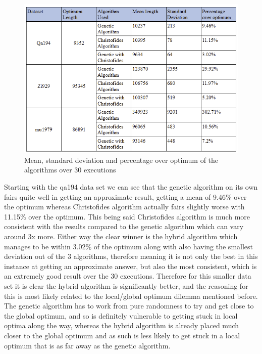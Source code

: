 \documentclass[11pt,a4paper,titlepage]{article}
\begin{document}
\begin{figure}[ht]
	\includegraphics[width=\textwidth]{MeanResults}
	\centering
	\caption{Mean, standard deviation and percentage over optimum of the algorithms over 30 executions}
\end{figure}

Starting with the qa194 data set we can see that the genetic algorithm on its own fairs quite well in getting an approximate result, getting a mean of 9.46\% over the optimum whereas Christofides algorithm actually fairs slightly worse with 11.15\% over the optimum. This being said Christofides algorithm is much more consistent with the results compared to the genetic algorithm which can vary around 3x more. Either way the clear winner is the hybrid algorithm which manages to be within 3.02\% of the optimum along with also having the smallest deviation out of the 3 algorithms, therefore meaning it is not only the best in this instance at getting an approximate answer, but also the most consistent, which is an extremely good result over the 30 executions. Therefore for this smaller data set it is clear the hybrid algorithm is significantly better, and the reasoning for this is most likely related to the local/global optimum dilemma mentioned before. The genetic algorithm has to work from pure randomness to try and get close to the global optimum, and so is definitely vulnerable to getting stuck in local optima along the way, whereas the hybrid algorithm is already placed much closer to the global optimum and as such is less likely to get stuck in a local optimum that is as far away as the genetic algorithm.
\end{document}
